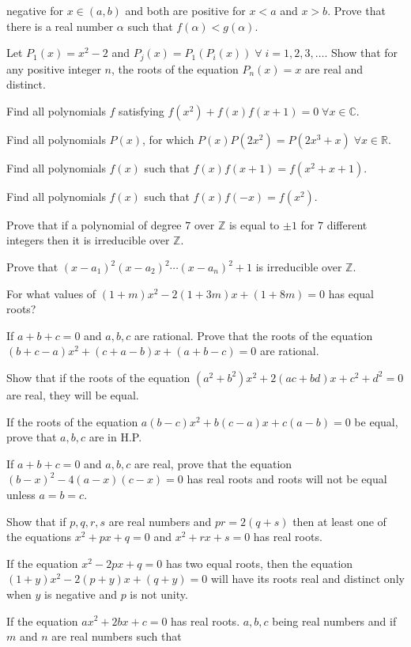   negative for $x\in(a, b)$ and both are positive for $x < a$ and $x > b$. Prove that there is a real number
  $\alpha$ such that $f(\alpha) < g(\alpha)$.
\item Let $P_1(x) = x^2 - 2$ and $P_j(x) = P_1(P_i(x))\;\forall\;i = 1, 2, 3, \ldots$. Show that for any
  positive integer $n$, the roots of the equation $P_n(x) = x$ are real and distinct.
\item Find all polynomials $f$ satisfying $f(x^2) + f(x)f(x + 1) = 0\;\forall x\in\mathbb{C}$.
\item Find all polynomials $P(x)$, for which $P(x)P(2x^2) = P(2x^3 + x)\;\forall x \in\mathbb{R}$.
\item Find all polynomials $f(x)$ such that $f(x)f(x + 1) = f(x^2 + x + 1)$.
\item Find all polynomials $f(x)$ such that $f(x)f(-x) = f(x^2)$.
\item Prove that if a polynomial of degree $7$ over $\mathbb{Z}$ is equal to $\pm1$ for $7$ different
  integers then it is irreducible over $\mathbb{Z}$.
\item Prove that $(x - a_1)^2(x - a_2)^2\cdots(x - a_n)^2 + 1$ is irreducible over $\mathbb{Z}$.
\item For what values of $(1 + m)x^2 - 2(1 + 3m)x + (1 + 8m) = 0$ has equal roots?
\item If $a + b + c = 0$ and $a,b,c$ are rational. Prove that the roots of the equation $(b + c - a)x^2 + (c + a - b)x + (a + b -
  c) = 0$ are rational.
\item Show that if the roots of the equation $(a^2 + b^2)x^2 + 2(ac + bd)x + c^2 + d^2 = 0$ are real, they will be equal.
\item If the roots of the equation $a(b - c)x^2 + b(c - a)x + c(a - b) = 0$ be equal, prove that $a, b, c$ are in H.P.
\item If $a + b + c = 0$ and $a,b,c$ are real, prove that the equation $(b - x)^2 - 4(a - x)(c - x) = 0$ has real roots and roots will
  not be equal unless $a=b=c$.
\item Show that if $p,q,r,s$ are real numbers and $pr = 2(q + s)$ then at least one of the equations $x^2 + px + q = 0$ and $x^2 +
  rx + s = 0$ has real roots.
\item If the equation $x^2 - 2px + q = 0$ has two equal roots, then the equation $(1 + y)x^2 - 2(p + y)x + (q + y) = 0$ will have
  its roots real and distinct only when $y$ is negative and $p$ is not unity.
\item If the equation $ax^2 + 2bx + c = 0$ has real roots. $a,b,c$ being real numbers and if $m$ and $n$ are real numbers such that
